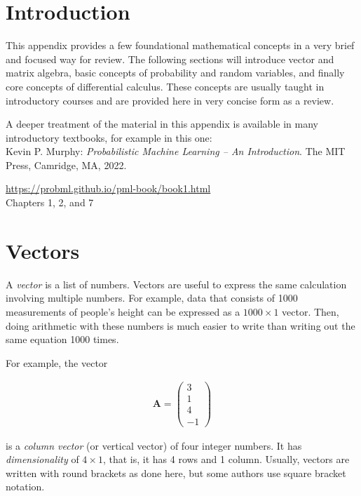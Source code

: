 
\section{Introduction}

This appendix provides a few foundational mathematical concepts in a very brief and focused way for review. The following sections will introduce vector and matrix algebra, basic concepts of probability and random variables, and finally core concepts of differential calculus. These concepts are usually taught in introductory courses and are provided here in very concise form as a review.

\begin{resourcebox}
A deeper treatment of the material in this appendix is available in many introductory textbooks, for example in this one:\\


Kevin P. Murphy: \emph{Probabilistic Machine Learning -- An Introduction}. The MIT Press, Camridge, MA, 2022.

\small\url{https://probml.github.io/pml-book/book1.html}\normalsize \\

Chapters 1, 2, and 7
\end{resourcebox}

\section{Vectors}

A \emph{vector} is a list of numbers. Vectors are useful to express the same calculation involving multiple numbers. For example, data that consists of 1000 measurements of people's height can be expressed as a $1000 \times 1$ vector. Then, doing arithmetic with these numbers is much easier to write than writing out the same equation 1000 times. 

For example, the vector

\begin{align*}
\mathbf{A} = \begin{pmatrix}3 \\ 1 \\ 4 \\ -1\end{pmatrix}
\end{align*}

is a \emph{column vector} (or vertical vector) of four integer numbers. It has \emph{dimensionality} of $4 \times 1$, that is, it has 4 rows and 1 column. Usually, vectors are written with round brackets as done here, but some authors use square bracket notation. 

